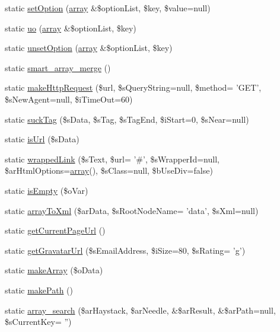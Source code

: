\begin{DoxyCompactItemize}
static \hyperlink{classCPSHelperBase_a67e30a5cd983c8c0d118a27db7b5066e}{setOption} (\hyperlink{list_8php_aa3205d038c7f8feb5c9f01ac4dfadc88}{array} \&\$optionList, \$key, \$value=null)
\item 
static \hyperlink{classCPSHelperBase_ae33c0f1f71a849e8a3df5d8d698ffb21}{uo} (\hyperlink{list_8php_aa3205d038c7f8feb5c9f01ac4dfadc88}{array} \&\$optionList, \$key)
\item 
static \hyperlink{classCPSHelperBase_ac92539436befc39865effc42a120759f}{unsetOption} (\hyperlink{list_8php_aa3205d038c7f8feb5c9f01ac4dfadc88}{array} \&\$optionList, \$key)
\item 
static \hyperlink{classCPSHelperBase_ae71ab8a8101aa09e0ba15ac210f632bf}{smart\_\-array\_\-merge} ()
\item 
static \hyperlink{classCPSHelperBase_aa4fbae93073c3a8240bd22c7664a9d89}{makeHttpRequest} (\$url, \$sQueryString=null, \$method= 'GET', \$sNewAgent=null, \$iTimeOut=60)
\item 
static \hyperlink{classCPSHelperBase_aef2d4e1f18258000c870a620e0b2f5ca}{suckTag} (\$sData, \$sTag, \$sTagEnd, \$iStart=0, \$sNear=null)
\item 
static \hyperlink{classCPSHelperBase_a0f62b558e100cdb8b0788a525b5614bf}{isUrl} (\$sData)
\item 
static \hyperlink{classCPSHelperBase_afcf7f91cc2558c1b99d7e1ab0ee465d2}{wrappedLink} (\$sText, \$url= '\#', \$sWrapperId=null, \$arHtmlOptions=\hyperlink{list_8php_aa3205d038c7f8feb5c9f01ac4dfadc88}{array}(), \$sClass=null, \$bUseDiv=false)
\item 
static \hyperlink{classCPSHelperBase_a556a868704aaa4629cbd8b4b9ebfa867}{isEmpty} (\$oVar)
\item 
static \hyperlink{classCPSHelperBase_afb9fa6864edba1cdfc91092132bc1da3}{arrayToXml} (\$arData, \$sRootNodeName= 'data', \$sXml=null)
\item 
static \hyperlink{classCPSHelperBase_afa854894f730e0557ca15278235bff1f}{getCurrentPageUrl} ()
\item 
static \hyperlink{classCPSHelperBase_a67951a3f7ed393fad3db2584bc0c3daf}{getGravatarUrl} (\$sEmailAddress, \$iSize=80, \$sRating= 'g')
\item 
static \hyperlink{classCPSHelperBase_a4f7ee8003b766553b8e47272e26609cc}{makeArray} (\$oData)
\item 
static \hyperlink{classCPSHelperBase_afe923f7a71bf641851bf3acb637228e0}{makePath} ()
\item 
static \hyperlink{classCPSHelperBase_a152a93f8dade240ad20afa4f207714ce}{array\_\-search} (\$arHaystack, \$arNeedle, \&\$arResult, \&\$arPath=null, \$sCurrentKey= '')

\end{DoxyCompactItemize}
